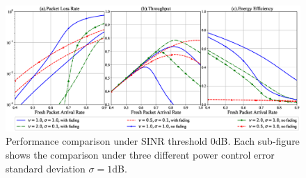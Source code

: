 \begin{figure}[!th]
	\centering
	\includegraphics[width=1.0\linewidth]{Chapter4/Figures/fading_shadowing_performance_case_0.0.eps}
	\caption{Performance comparison under SINR threshold $0$dB. Each sub-figure shows the comparison under three different power control error standard deviation $\sigma =1$dB.}
	\label{fig:fading_shadowing_performance_0}
\end{figure}

% 


%
%


